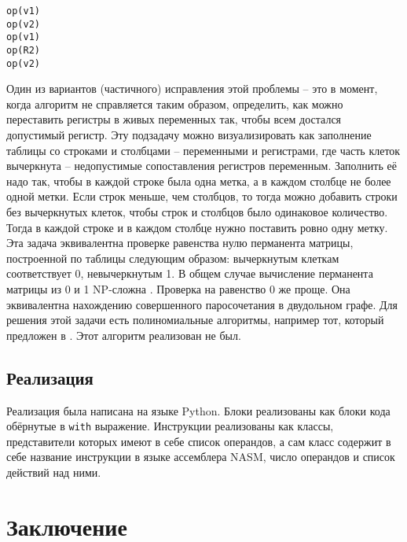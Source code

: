 \documentclass[a4paper,14pt]{extarticle}
\begin{document}
\begin{lstlisting}[caption={Пример кода, в котором алгоритм может не справится}, label=fail_when_possible, float=b]
op(v1)
op(v2)
op(v1)
op(R2)
op(v2)
\end{lstlisting}

Один из вариантов (частичного) исправления этой проблемы -- это в момент, когда алгоритм не справляется таким образом,
определить, как можно переставить регистры в живых переменных так, чтобы всем достался допустимый регистр.
Эту подзадачу можно визуализировать как заполнение таблицы со строками и столбцами -- переменными и регистрами,
где часть клеток вычеркнута -- недопустимые сопоставления регистров переменным.
Заполнить её надо так, чтобы в каждой строке была одна метка, а в каждом столбце не более одной метки.
Если строк меньше, чем столбцов, то тогда можно добавить строки без вычеркнутых клеток, чтобы строк и столбцов было одинаковое количество.
Тогда в каждой строке и в каждом столбце нужно поставить ровно одну метку.
Эта задача эквивалентна проверке равенства нулю перманента матрицы, построенной по таблицы следующим образом:
вычеркнутым клеткам соответствует 0, невычеркнутым 1.
В общем случае вычисление перманента матрицы из 0 и 1 NP-сложна \cite{valiant_complexity_1979}.
Проверка на равенство 0 же проще.
Она эквивалентна нахождению совершенного паросочетания в двудольном графе.
Для решения этой задачи есть полиномиальные алгоритмы, например тот, который предложен в \cite{chandran_practical_2011}.
Этот алгоритм реализован не был.

\subsection{Реализация}
Реализация была написана на языке Python.
Блоки реализованы как блоки кода обёрнутые в \texttt{with} выражение.
Инструкции реализованы как классы, представители которых имеют в себе список операндов,
а сам класс содержит в себе название инструкции в языке ассемблера NASM, число операндов и список действий над ними.


\section{Заключение}

\newpage



\end{document}
